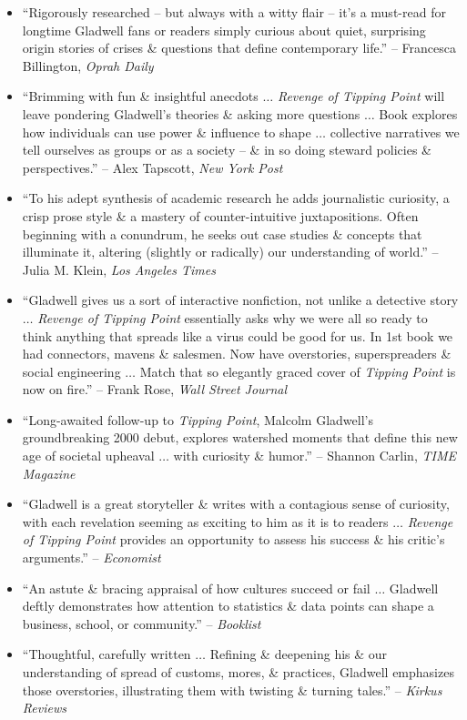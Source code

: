 \documentclass{article}
\begin{document}
\begin{enumerate}
\begin{itemize}
		\item ``Rigorously researched -- but always with a witty flair -- it's a must-read for longtime {\sc Gladwell} fans or readers simply curious about quiet, surprising origin stories of crises \& questions that define contemporary life.'' -- {\sc Francesca Billington}, {\it Oprah Daily}
		\item ``Brimming with fun \& insightful anecdots $\ldots$ {\it Revenge of Tipping Point} will leave pondering {\sc Gladwell}'s theories \& asking more questions $\ldots$ Book explores how individuals can use power \& influence to shape $\ldots$ collective narratives we tell ourselves as groups or as a society -- \& in so doing steward policies \& perspectives.'' -- {\sc Alex Tapscott}, {\it New York Post}
		\item ``To his adept synthesis of academic research he adds journalistic curiosity, a crisp prose style \& a mastery of counter-intuitive juxtapositions. Often beginning with a conundrum, he seeks out case studies \& concepts that illuminate it, altering (slightly or radically) our understanding of world.'' -- {\sc Julia M. Klein}, {\it Los Angeles Times}
		\item ``{\sc Gladwell} gives us a sort of interactive nonfiction, not unlike a detective story $\ldots$ {\it Revenge of Tipping Point} essentially asks why we were all so ready to think anything that spreads like a virus could be good for us. In 1st book we had connectors, mavens \& salesmen. Now have overstories, superspreaders \& social engineering $\ldots$ Match that so elegantly graced cover of {\it Tipping Point} is now on fire.'' -- {\sc Frank Rose}, {\it Wall Street Journal}
		\item ``Long-awaited follow-up to {\it Tipping Point}, {\sc Malcolm Gladwell}'s groundbreaking 2000 debut, explores watershed moments that define this new age of societal upheaval $\ldots$ with curiosity \& humor.'' -- {\sc Shannon Carlin}, {\it TIME Magazine}
		\item ``{\sc Gladwell} is a great storyteller \& writes with a contagious sense of curiosity, with each revelation seeming as exciting to him as it is to readers $\ldots$ {\it Revenge of Tipping Point} provides an opportunity to assess his success \& his critic's arguments.'' -- {\it Economist}
		\item ``An astute \& bracing appraisal of how cultures succeed or fail $\ldots$ {\sc Gladwell} deftly demonstrates how attention to statistics \& data points can shape a business, school, or community.'' -- {\it Booklist}
		\item ``Thoughtful, carefully written $\ldots$ Refining \& deepening his \& our understanding of spread of customs, mores, \& practices, {\sc Gladwell} emphasizes those overstories, illustrating them with twisting \& turning tales.'' -- {\it Kirkus Reviews}
	\end{itemize}
	

\end{enumerate}
\end{document}
